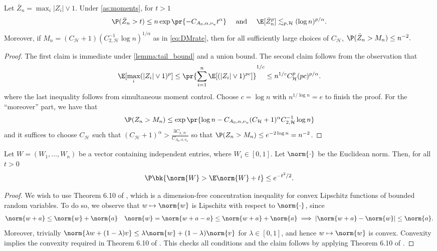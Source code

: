 \documentclass[12pt, reqno]{amsart}
\newcommand{\Hyperparams}{\mathcal{H}}
\numberwithin{equation}{section}
\begin{document}
\begin{refsection}
\begin{appendices}
\begin{lemma}
\label{lemma:tail_bound_max}
Let $\bar Z_n = \max_i |Z_i| \vee 1$. Under \cref{as:moments}, for $t > 1$ \[
\P(\bar Z_n > t) \le n\exp\pr{-C_{A_0, \alpha, \nu_u} t^\alpha}
\quad \text{ and } \quad
\E[\bar Z_n^p] \lesssim_{p, \Hyperparams} (\log n)^{p/\alpha}.
\]
Moreover, if $M_n = (C_\Hyperparams + 1) (C_{2,\Hyperparams}^{-1} \log n)^{1/\alpha}$ as
in
\eqref{eq:DMrate}, then for all sufficiently large choices of $C_\Hyperparams$, $\P(\bar
Z_n > M_n) \le n^{-2}.$
\end{lemma}
\begin{proof}
The first claim is immediate under \cref{lemma:tail_bound} and a union bound. The second
claim follows from the observation that \[
\E[\max_i (|Z_i| \vee 1)^p] \le \pr{\sum_{i=1}^n \E[(|Z_i| \vee 1)^{pc}]}^{1/c} \le n^
{1/c}
C_\Hyperparams^{p} (pc)^{p/\alpha}.
\]
where the last inequality follows from simultaneous moment control. Choose $c = \log n$
with $n^{1/\log n} = e$ to finish the proof. For the ``moreover'' part, we have that \[
\P(Z_n > M_n) \le \exp\pr{
    \log n - C_{A_0, \alpha, \nu_u} (C_{\Hyperparams} + 1)^{\alpha} C_{2,\Hyperparams}^
    {-1} \log n
}
\]
and it suffices to choose $C_{\Hyperparams}$ such that $(C_{\Hyperparams} + 1)^{\alpha} >
\frac{3 C_{2,\Hyperparams} }{C_{A_0, \alpha, \nu_u}}$ so that $\P(Z_n > M_n) \le e^
{-2\log n} = n^{-2}$.
\end{proof}

\begin{lemma}
\label{lemma:norm_concentration}
Let $W = (W_1,\ldots, W_n)$ be a vector containing independent entries, where $W_i \in
[0,1]$. Let $\norm{\cdot}$ be the Euclidean norm. Then, for all $t > 0$ \[
\P\bk{\norm{W} > \E\norm{W} + t} \le e^{-t^2/2}.
\]
\end{lemma}
\begin{proof}
We wish to use Theorem 6.10 of \citet{boucheron2013concentration}, which is a
dimension-free concentration inequality for convex Lipschitz functions of bounded random
variables. To do so, we observe that $w \mapsto \norm{w}$ is Lipschitz with respect to
$\norm{\cdot}$, since \[
\norm{w + a} \le \norm{w} + \norm{a} \quad \norm{w} = \norm{w+a-a} \le \norm{w+a} +
\norm{a} \implies |\norm{w+a} - \norm{w}| \le \norm{a}.
\]
Moreover, trivially $\norm{\lambda w + (1-\lambda) v} \le \lambda\norm{w} + (1-\lambda)
\norm{v}$ for $\lambda \in [0,1]$, and hence $w\mapsto \norm{w}$ is convex. Convexity
implies the convexity required in Theorem 6.10 of \citet{boucheron2013concentration}. This
checks all conditions and the claim follows by applying Theorem 6.10 of
\citet{boucheron2013concentration}.
\end{proof}


\end{appendices}
\end{refsection}
\end{document}
